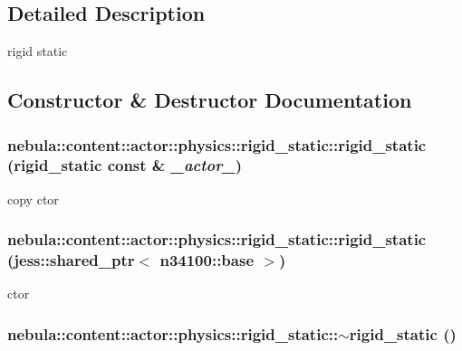 \subsection{Detailed Description}
rigid static 

\subsection{Constructor \& Destructor Documentation}
\hypertarget{classnebula_1_1content_1_1actor_1_1physics_1_1rigid__static_aa97ef700bd409b75f315e227edf2c154}{
\subsubsection[{rigid\_\-static}]{\setlength{\rightskip}{0pt plus 5cm}nebula::content::actor::physics::rigid\_\-static::rigid\_\-static ({\bf rigid\_\-static} const \& {\em \_\-actor\_\-})}}
\label{classnebula_1_1content_1_1actor_1_1physics_1_1rigid__static_aa97ef700bd409b75f315e227edf2c154}


copy ctor \hypertarget{classnebula_1_1content_1_1actor_1_1physics_1_1rigid__static_a177e9d7bdf353f3fa8c638f94d420e1a}{
\subsubsection[{rigid\_\-static}]{\setlength{\rightskip}{0pt plus 5cm}nebula::content::actor::physics::rigid\_\-static::rigid\_\-static (jess::shared\_\-ptr$<$ {\bf n34100::base} $>$)}}
\label{classnebula_1_1content_1_1actor_1_1physics_1_1rigid__static_a177e9d7bdf353f3fa8c638f94d420e1a}


ctor \hypertarget{classnebula_1_1content_1_1actor_1_1physics_1_1rigid__static_a7dffb6ad1b4b49383a7c7c2fa28be0cf}{
\subsubsection[{$\sim$rigid\_\-static}]{\setlength{\rightskip}{0pt plus 5cm}nebula::content::actor::physics::rigid\_\-static::$\sim$rigid\_\-static ()}}
\label{classnebula_1_1content_1_1actor_1_1physics_1_1rigid__static_a7dffb6ad1b4b49383a7c7c2fa28be0cf}


